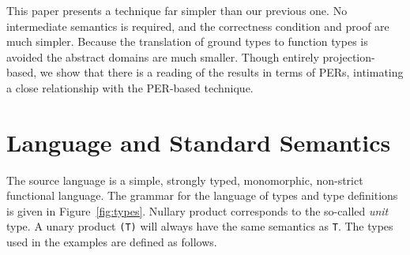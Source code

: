 \begin{article}
This paper presents a technique far simpler than our
previous one.  No intermediate semantics is required, and the
correctness condition and proof are much simpler.  Because the
translation of ground types to function types is avoided the abstract
domains are much smaller. Though entirely projection-based, we show
that there is a reading of the results in terms of PERs, intimating a
close relationship with the PER-based technique.

\section{Language and Standard Semantics}

The source language is a simple, strongly typed, monomorphic,
non-strict functional language.  The grammar for the language of types
and type definitions is given in Figure~\ref{fig:types}.
Nullary product corresponds to the so-called {\it unit\/} type.  A
unary product \mbox{\tt (T)} will always have the same semantics as \mbox{\tt T}.  The
types used in the examples are defined as follows.
\begin{flushleft}
\vspace{-0.0em}\vspace{-0.0em}\\
\vspace{-0.0em}\\
\makebox{\progsize\tt }\vspace{-0.0em}\\
\vspace{-0.0em}\\
\vspace{-0.0em}
\end{flushleft}


\end{article}
